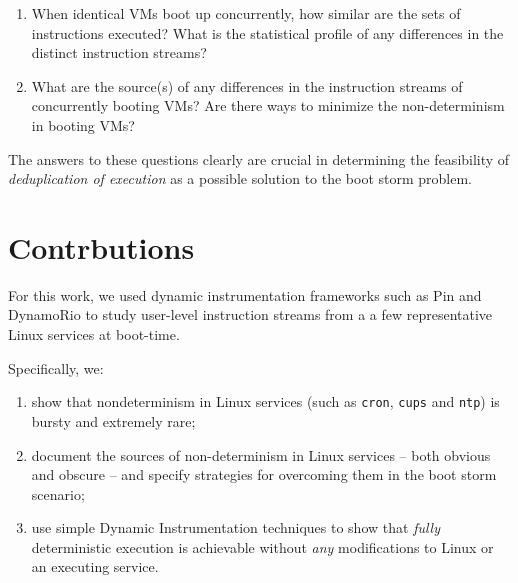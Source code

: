 \begin{enumerate}

\item When identical VMs boot up concurrently, how similar
are the sets of instructions executed? What is the statistical
profile of any differences in the distinct instruction streams?

\item What are the source(s) of any differences in
the instruction streams of concurrently booting VMs?
Are there ways to minimize the non-determinism in
booting VMs?

\end{enumerate}

The answers to these questions clearly are crucial in determining
the feasibility of \emph{deduplication of execution} as a possible solution
to the boot storm problem. 

\section{Contrbutions}
For this work, we used dynamic instrumentation frameworks such as Pin \cite{luk2005pin} and
DynamoRio \cite{bruening2004dr} to study user-level instruction streams from a
a few representative Linux services at boot-time. \newline

Specifically, we:
\begin {enumerate}
\item show that nondeterminism in Linux services (such as \texttt{cron}, \texttt{cups} and \texttt{ntp}) 
  is bursty and extremely rare;
\item document the sources of non-determinism in Linux services -- both obvious and obscure --
  and specify strategies for overcoming them in the boot storm scenario;
\item use simple Dynamic Instrumentation techniques to show that \emph{fully} deterministic execution is achievable
  without \emph{any} modifications to Linux or an executing service.
\end {enumerate}

